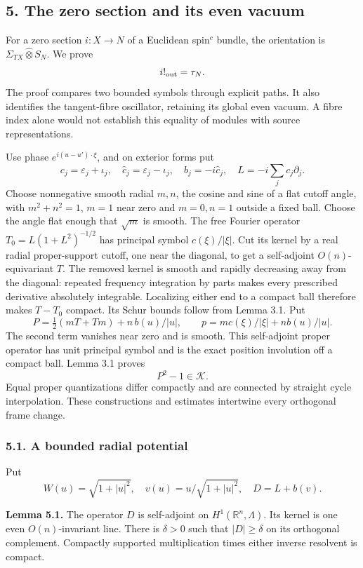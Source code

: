 \documentclass[
  11pt,
]{article}
\begin{document}
\subsection{5. The zero section and its even
vacuum}\label{the-zero-section-and-its-even-vacuum}

For a zero section \(i:X\to N\) of a Euclidean spin\(^{c}\) bundle, the
orientation is \(\Sigma_{TX}\widehat\otimes S_N\). We prove \[
 i!_{\rm out}=\tau_N.
\] The proof compares two bounded symbols through explicit paths. It
also identifies the tangent-fibre oscillator, retaining its global even
vacuum. A fibre index alone would not establish this equality of modules
with source representations.

Use phase \(e^{i(u-u')\cdot\xi}\), and on exterior forms put \[
 c_j=\varepsilon_j+\iota_j,\quad \widehat c_j=\varepsilon_j-\iota_j,
 \quad b_j=-i\widehat c_j,\quad L=-i\sum_jc_j\partial_j.
 \tag{5.1}
\] Choose nonnegative smooth radial \(m,n\), the cosine and sine of a
flat cutoff angle, with \(m^2+n^2=1\), \(m=1\) near zero and \(m=0,n=1\)
outside a fixed ball. Choose the angle flat enough that \(\sqrt m\) is
smooth. The free Fourier operator \(T_0=L(1+L^2)^{-1/2}\) has principal
symbol \(c(\xi)/|\xi|\). Cut its kernel by a real radial proper-support
cutoff, one near the diagonal, to get a self-adjoint
\(O(n)\)-equivariant \(T\). The removed kernel is smooth and rapidly
decreasing away from the diagonal: repeated frequency integration by
parts makes every prescribed derivative absolutely integrable.
Localizing either end to a compact ball therefore makes \(T-T_0\)
compact. Its Schur bounds follow from Lemma 3.1. Put \[
 P=\tfrac12(mT+Tm)+n\,b(u)/|u|,
 \qquad p=m c(\xi)/|\xi|+n b(u)/|u|.
 \tag{5.3}
\] The second term vanishes near zero and is smooth. This self-adjoint
proper operator has unit principal symbol and is the exact position
involution off a compact ball. Lemma 3.1 proves \[
 P^2-1\in\mathcal K.
 \tag{5.5}
\] Equal proper quantizations differ compactly and are connected by
straight cycle interpolation. These constructions and estimates
intertwine every orthogonal frame change.

\subsubsection{5.1. A bounded radial
potential}\label{a-bounded-radial-potential}

Put \[
W(u)=\sqrt{1+|u|^2},\quad v(u)=u/\sqrt{1+|u|^2},\quad D=L+b(v).
\tag{5.6}
\]

\textbf{Lemma 5.1.} The operator \(D\) is self-adjoint on
\(H^1(\mathbb R^n,\Lambda)\). Its kernel is one even \(O(n)\)-invariant
line. There is \(\delta>0\) such that \(|D|\geq\delta\) on its
orthogonal complement. Compactly supported multiplication times either
inverse resolvent is compact.
\end{document}
